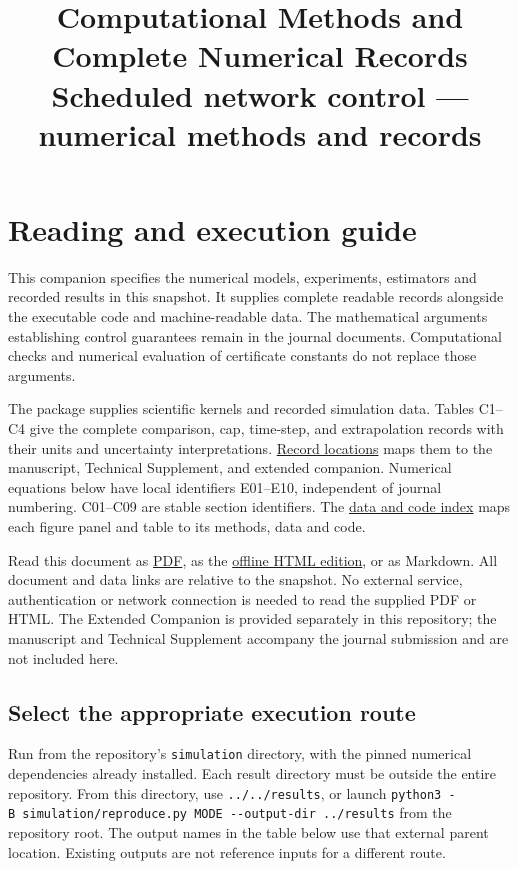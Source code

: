 \documentclass[11pt,a4paper]{article}
\title{\textbf{Computational Methods and Complete Numerical
Records}\\[6pt]\large Scheduled network control --- numerical methods
and records}
\author{}\date{}
\begin{document}
\maketitle
\thispagestyle{fancy}
\tableofcontents
\clearpage
\section{Reading and execution guide}\label{guide}

This companion specifies the numerical models, experiments, estimators
and recorded results in this snapshot. It supplies complete readable
records alongside the executable code and machine-readable data. The
mathematical arguments establishing control guarantees remain in the
journal documents. Computational checks and numerical evaluation of
certificate constants do not replace those arguments.

The package supplies scientific kernels and recorded simulation data.
Tables C1--C4 give the complete comparison, cap, time-step, and
extrapolation records with their units and uncertainty interpretations.
\href{RECORD_LOCATIONS.md}{Record locations} maps them to the
manuscript, Technical Supplement, and extended companion. Numerical
equations below have local identifiers E01--E10, independent of journal
numbering. C01--C09 are stable section identifiers. The
\href{DATA_INDEX.md}{data and code index} maps each figure panel and
table to its methods, data and code.

Read this document as \href{COMPUTATIONAL_COMPANION.pdf}{PDF}, as the
\href{COMPUTATIONAL_COMPANION.html}{offline HTML edition}, or as
Markdown. All document and data links are relative to the snapshot. No
external service, authentication or network connection is needed to read
the supplied PDF or HTML. The Extended Companion is provided separately
in this repository; the manuscript and Technical Supplement accompany
the journal submission and are not included here.

\subsection{Select the appropriate execution
route}\label{select-the-appropriate-execution-route}

Run from the repository's \texttt{simulation} directory, with the pinned
numerical dependencies already installed. Each result directory must be
outside the entire repository. From this directory, use
\texttt{../../results}, or launch
\texttt{python3\ -B\ simulation/reproduce.py\ MODE\ -\/-output-dir\ ../results}
from the repository root. The output names in the table below use that
external parent location. Existing outputs are not reference inputs for
a different route.
\end{document}
